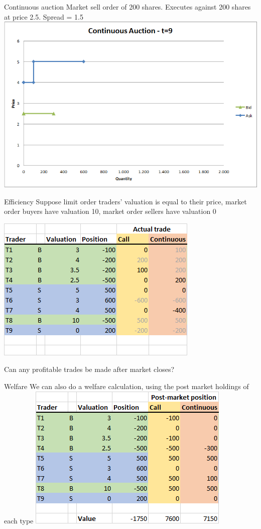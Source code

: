 \documentclass[english,10pt
,aspectratio=169
]{beamer}
\begin{document}
\begin{frame}{Continuous auction}
	Market sell order of 200 shares. Executes against 200 shares at price 2.5. Spread = 1.5
	\center
	\includegraphics[width=.75\linewidth]{pics/Continuous_t9}
\end{frame}


\begin{frame}{Efficiency}
	Suppose limit order traders' valuation is equal to their price, market order buyers have valuation 10, market order sellers have valuation 0
	
	{\center
		\includegraphics[width=.6\linewidth]{pics/Efficiency2}
	\\
	}
	
	Can any profitable trades be made after market closes?
\end{frame}


\begin{frame}{Welfare}
	We can also do a welfare calculation, using the post market holdings of each type
	\quad
	\center
	\includegraphics[width=.6\linewidth]{pics/Welfare2}
	\quad
\end{frame}
\end{document}
